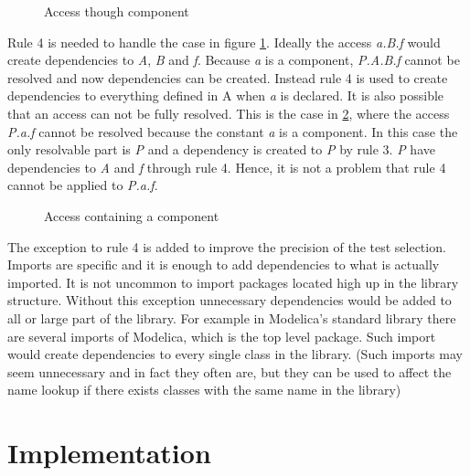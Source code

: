 \documentclass{cslthse-msc}
\begin{document}
\begin{figure}[!htbp]
    \centering
    \qquad
    \subfloat{\raisebox{4.7 cm}{}}
    \caption{Access though component}
    \label{fig:component}
\end{figure}

Rule 4 is needed to handle the case in figure \ref{fig:component}. Ideally the access \textit{a.B.f} would create dependencies to \textit{A}, \textit{B} and \textit{f}. Because \textit{a} is a component, \textit{P.A.B.f} cannot be resolved and now dependencies can be created. Instead rule 4 is used to create dependencies to everything defined in A when \textit{a} is declared.
It is also possible that an access can not be fully resolved. This is the case in \ref{fig:brokenAccess}, where the access \textit{P.a.f} cannot be resolved because the constant \textit{a} is a component. In this case the only resolvable part is \textit{P} and a  dependency is created to \textit{P} by rule 3. \textit{P} have dependencies to \textit{A} and \textit{f} through rule 4. Hence, it is not a problem that rule 4 cannot be applied to \textit{P.a.f}.

\begin{figure}[!htbp]
    \centering
    \qquad
    \subfloat{\raisebox{4.0 cm}{}}
    \caption{Access containing a component}
    \label{fig:brokenAccess}
\end{figure}

The exception to rule 4 is added to improve the precision of the test selection. Imports are specific and it is enough to add dependencies to what is actually imported. It is not uncommon to import packages located high up in the library structure. Without this exception unnecessary dependencies would be added to all or large part of the library. For example in Modelica's standard library there are several imports of Modelica, which is the top level package. Such import would create dependencies to every single class in the library. (Such imports may seem unnecessary and in fact they often are, but they can be used to affect the name lookup if there exists classes with the same name in the library)  

\chapter[Implementation]{Implementation}
\end{document}
